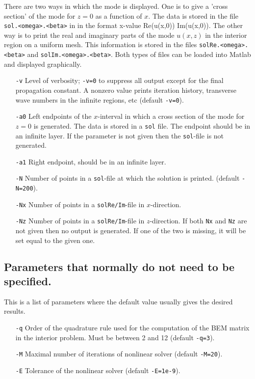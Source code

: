 \documentclass{article}
\begin{document}
There are two ways in which the mode is displayed. One is to give a
'cross section' of the mode for $z=0$ as a function of $x$. The data
is stored in the file \texttt{sol.<omega>.<beta>} in in the format 
x-value  Re(u(x,0))  Im(u(x,0)). The other way is to print the real
and imaginary parts of the mode $u(x,z)$ in the interior region on a
uniform mesh. This information is stored in the files 
\texttt{solRe.<omega>.<beta>} and \texttt{solIm.<omega>.<beta>}. Both
types of files can be loaded into Matlab and displayed graphically.
\begin{itemize}
  \item[\texttt{-v}] Level of verbosity; \texttt{-v=0} to suppress all
  output except for the final propagation constant. A nonzero value
  prints iteration history, transverse wave numbers in the infinite
  regions, etc (default \texttt{-v=0}).
  \item[\texttt{-a0}] Left endpoints of the $x$-interval in which a
  cross section of the mode for $z=0$ is generated. The data is stored
  in a \texttt{sol} file. The endpoint should be in an infinite layer.
  If the parameter is not given then the \texttt{sol}-file is not generated. 
  \item[\texttt{-a1}] Right endpoint, should be in an infinite layer. 
\item[\texttt{-N}] Number of points in a \texttt{sol}-file at which
  the solution is printed.   (default \texttt{-N=200}).
\item[\texttt{-Nx}] Number of points in a \texttt{solRe/Im}-file in
  $x$-direction.
\item[\texttt{-Nz}] Number of points in a \texttt{solRe/Im}-file in
  $z$-direction. If both \texttt{Nx} and \texttt{Nz} are not given
  then no output is generated. If one of the two is missing, it will
  be set equal to the given one.
\end{itemize}

\subsection{Parameters that normally do not need to be specified.}

This is a list of parameters where the default value usually gives the
desired results.
\begin{itemize}
  \item[\texttt{-q}] Order of the quadrature rule used for the
  computation of the BEM matrix in the interior problem. Must be
  between 2 and 12 (default \texttt{-q=3}).
  \item[\texttt{-M}] Maximal number of iterations of nonlinear solver (default
  \texttt{-M=20}).
  \item[\texttt{-E}] Tolerance of the nonlinear solver (default
  \texttt{-E=1e-9}).
\end{itemize}
\end{document}
